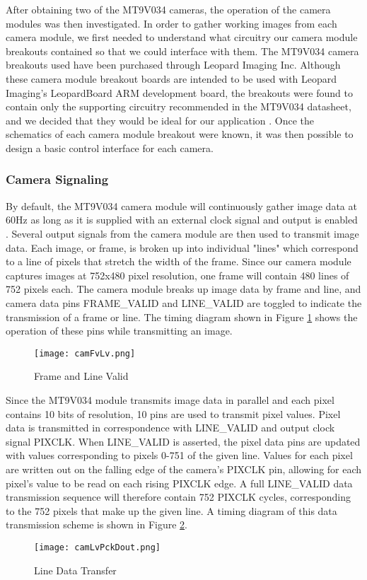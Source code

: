 \par
After obtaining two of the MT9V034 cameras, the operation of the camera modules was then investigated. In order to gather working images from each camera module, we first needed to understand what circuitry our camera module breakouts contained so that we could interface with them. The MT9V034 camera breakouts used have been purchased through Leopard Imaging Inc. Although these camera module breakout boards are intended to be used with Leopard Imaging's LeopardBoard ARM development board, the breakouts were found to contain only the supporting circuitry recommended in the MT9V034 datasheet, and we decided that they would be ideal for our application \cite{livm34lp,mt9v034}. Once the schematics of each camera module breakout were known, it was then possible to design a basic control interface for each camera.
\subsubsection{Camera Signaling}
By default, the MT9V034 camera module will continuously gather image data at 60Hz  as long as it is supplied with an external clock signal and output is enabled \cite{mt9v034}. Several output signals from the camera module are then used to transmit image data. Each image, or frame, is broken up into individual "lines" which correspond to a line of pixels that stretch the width of the frame. Since our camera module captures images at 752x480 pixel resolution, one frame will contain 480 lines of 752 pixels each. The camera module breaks up image data by frame and line, and camera data pins FRAME\_VALID and LINE\_VALID are toggled to indicate the transmission of a frame or line. The timing diagram shown in Figure \ref{FvLv} shows the operation of these pins while transmitting an image.

\begin{figure}[H]
	\centerline{\texttt{[image: camFvLv.png]}}
	\caption{Frame and Line Valid \cite{mt9v034}}
	\label{FvLv}
\end{figure}

\par
Since the MT9V034 module transmits image data in parallel and each pixel contains 10 bits of resolution, 10 pins are used to transmit pixel values. Pixel data is transmitted in correspondence with LINE\_VALID and output clock signal PIXCLK. When LINE\_VALID is asserted, the pixel data pins are updated with values corresponding to pixels 0-751 of the given line. Values for each pixel are written out on the falling edge of the camera's PIXCLK pin, allowing for each pixel's value to be read on each rising PIXCLK edge. A full LINE\_VALID data transmission sequence will therefore contain 752 PIXCLK cycles, corresponding to the 752 pixels that make up the given line. A timing diagram of this data transmission scheme is shown in Figure \ref{LvDout}.  
\begin{figure}[H]
	\centerline{\texttt{[image: camLvPckDout.png]}}
	\caption{Line Data Transfer \cite{mt9v034}}
	\label{LvDout}
\end{figure}

